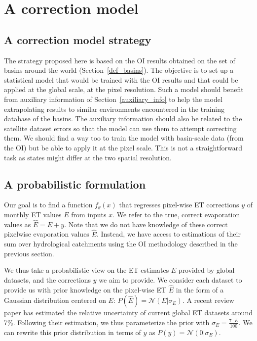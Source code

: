 \documentclass[draft]{agujournal2019}
\begin{document}
\section{A correction model}

\subsection{A correction model strategy}

The strategy proposed here is based on the OI results obtained on the set of basins around the world (Section~\ref{def_basins}). 
The objective is to set up a statistical model that would be trained with the OI results and that could be applied at the global scale, at the pixel resolution. 
Such a model should benefit from auxiliary information of Section~\ref{auxiliary_info} to help the model extrapolating results to similar environments encountered in the training database of the basins. 
The auxiliary information should also be related to the satellite dataset errors so that the model can use them to attempt correcting them.
 We should find a way too to train the model with basin-scale data (from the OI) but be able to apply it at the pixel scale. 
This is not a straightforward task as states might differ at the two spatial resolution.

\subsection{A probabilistic formulation}

Our goal is to find a function $f_{\theta}(x)$ that regresses pixel-wise ET corrections $y$ of monthly ET values $E$ from inputs $x$.
We refer to the true, correct evaporation values as $\hat E = E + y$.
Note that we do not have knowledge of these correct pixelwise evaporation values $\hat E$.
Instead, we have access to estimations of their sum over hydrological catchments using the OI methodology described in the previous section.

We thus take a probabilistic view on the ET estimates $E$ provided by global datasets, and the corrections $y$ we aim to provide.
We consider each dataset to provide us with prior knowledge on the pixel-wise ET $\hat E$ 
in the form of a Gaussian distribution centered on $E$:  $P(\hat E)=\mathcal{N}(E | \sigma_E)$. 
A recent review paper \cite{XXX} has estimated the relative uncertainty of current global ET datasets around 7\%.
Following their estimation, we thus parameterize the prior with $\sigma_E= \frac{7 \cdot E}{100}$.
We can rewrite this prior distribution in terms of $y$ as $P(y)=\mathcal{N}(0 | \sigma_E)$.
\end{document}
